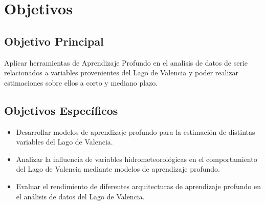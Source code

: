 \documentclass[12pt]{article}
\begin{document}
\section{Objetivos}

\subsection{Objetivo Principal}
Aplicar herramientas de Aprendizaje Profundo en el analisis de datos de serie relacionados a variables provenientes del Lago de Valencia y poder realizar estimaciones sobre ellos a corto y mediano plazo.

\subsection{Objetivos Específicos}
\begin{itemize}
    \item Desarrollar modelos de aprendizaje profundo para la estimación de distintas variables del Lago de Valencia.
    \item Analizar la influencia de variables hidrometeorológicas en el comportamiento del Lago de Valencia mediante modelos de aprendizaje profundo.
    \item Evaluar el rendimiento de diferentes arquitecturas de aprendizaje profundo en el análisis de datos del Lago de Valencia.
\end{itemize}
\end{document}
